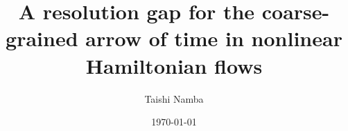 \documentclass[aps,pre,reprint,twocolumn,nofootinbib,superscriptaddress]{revtex4-2}
\theoremstyle{remark}
\begin{document}
\title{A resolution gap for the coarse-grained arrow of time in nonlinear Hamiltonian flows}

\author{Taishi Namba}

\date{\today}



\maketitle










\appendix







\end{document}
